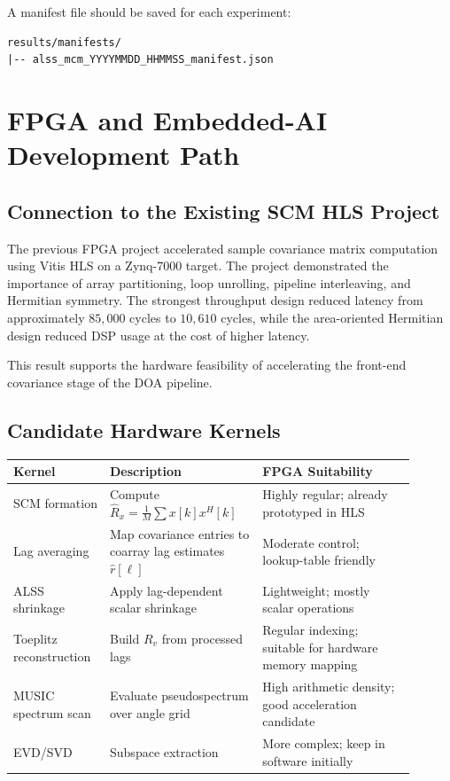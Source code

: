 \documentclass[11pt,letterpaper]{article}
\begin{document}
A manifest file should be saved for each experiment:

\begin{lstlisting}
results/manifests/
|-- alss_mcm_YYYYMMDD_HHMMSS_manifest.json
\end{lstlisting}

\section{FPGA and Embedded-AI Development Path}

\subsection{Connection to the Existing SCM HLS Project}

The previous FPGA project accelerated sample covariance matrix computation using Vitis HLS on a Zynq-7000 target. The project demonstrated the importance of array partitioning, loop unrolling, pipeline interleaving, and Hermitian symmetry. The strongest throughput design reduced latency from approximately $85{,}000$ cycles to $10{,}610$ cycles, while the area-oriented Hermitian design reduced DSP usage at the cost of higher latency.

This result supports the hardware feasibility of accelerating the front-end covariance stage of the DOA pipeline.

\subsection{Candidate Hardware Kernels}

\begin{longtable}{p{0.20\linewidth}p{0.35\linewidth}p{0.35\linewidth}}
\toprule
Kernel & Description & FPGA Suitability \\
\midrule
SCM formation & Compute $\hat{R}_x=\frac{1}{M}\sum x[k]x^H[k]$ & Highly regular; already prototyped in HLS \\
Lag averaging & Map covariance entries to coarray lag estimates $\hat{r}[\ell]$ & Moderate control; lookup-table friendly \\
ALSS shrinkage & Apply lag-dependent scalar shrinkage & Lightweight; mostly scalar operations \\
Toeplitz reconstruction & Build $R_v$ from processed lags & Regular indexing; suitable for hardware memory mapping \\
MUSIC spectrum scan & Evaluate pseudospectrum over angle grid & High arithmetic density; good acceleration candidate \\
EVD/SVD & Subspace extraction & More complex; keep in software initially \\
\bottomrule
\end{longtable}
\end{document}
